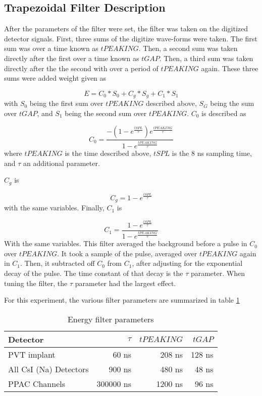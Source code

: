 \documentclass[main.tex]{subfiles}
\begin{document}
\subsection{Trapezoidal Filter Description}
After the parameters of the filter were set, the filter was taken on the digitized detector signals.
First, three sums of the digitize wave-forms were taken.
The first sum was over a time known as $tPEAKING$.
Then, a second sum was taken directly after the first over a time known as $tGAP$.
Then, a third sum was taken directly after the the second with over a period of $tPEAKING$ again.
These three sums were added weight given as  

\begin{equation}
	E = C_{0} * S_{0} + C_{g} * S_{g} + C_{1} * S_{1} 
	\label{eq:ensum}
\end{equation} 
%
with $S_{0}$ being the first sum over $tPEAKING$ described above, $S_{G}$ being the sum over $tGAP$, and $S_{1}$ being the second sum over $tPEAKING$.
$C_{0}$ is described as

\begin{equation}
	C_{0} = \frac{-(1 - e^{\frac{tSPL}{\tau}})e^{\frac{tPEAKING}{\tau}}}{1 - e^{\frac{tPEAKING}{\tau}}}
	\label{eq:c0sum}
\end{equation}
%
where $tPEAKING$ is the time described above, $tSPL$ is the 8 ns sampling time, and $\tau$ an additional parameter.

$C_{g}$ is 

\begin{equation}
	C_{g} = 1 - e^{\frac{tSPL}{\tau}}
	\label{eq:cgsum}
\end{equation}
%
with the same variables.
Finally, $C_{1}$ is 

\begin{equation}
	C_{1} = \frac{1 - e^{\frac{tSPL}{\tau}}}{1 - e^{\frac{tPEAKING}{\tau}}}
	\label{eq:c1sum}
\end{equation}
%
With the same variables.
This filter averaged the background before a pulse in $C_{0}$ over $tPEAKING$.
It took a sample of the pulse, averaged over $tPEAKING$ again in $C_{1}$.
Then, it subtracted off $C_{0}$ from $C_{1}$, after adjusting for the exponential decay of the pulse.
The time constant of that decay is the $\tau$ parameter.
When tuning the filter, the $\tau$ parameter had the largest effect.

For this experiment, the various filter parameters are summarized in table \ref{tab:pixieparams}  
%
\begin{table}[!hbt]
	\centering
	\caption{Energy filter parameters}
			\begin{tabular}{lrrr}
			Detector & $\tau$ & $tPEAKING$ & $tGAP$ \\ \hline
			PVT implant & 60 ns & 208 ns & 128 ns \\
			All CsI (Na) Detectors & 900 ns & 480 ns & 48 ns \\
			PPAC Channels & 300000 ns & 1200 ns & 96 ns  
			\end{tabular}	
			\label{tab:pixieparams}
\end{table}
%
\end{document}

